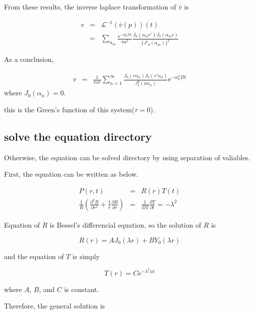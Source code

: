 \documentclass{article}
\begin{document}
From these results, the inverse laplace transformation of $\bar{v}$ is

\begin{eqnarray}
  v &=& \mathscr{L}^{-1} \left(\bar{v}(p)\right)(t) \nonumber \\
    &=& \sum_{\alpha_m} \frac{\mathrm{e}^{-\alpha_{m}^{2}Dt}}{\pi a^2}
        \frac{J_0(\alpha_mr')J_0(\alpha_mr)}{\{J'_0(\alpha_m)\}^2}
\end{eqnarray}

As a conclusion,

\begin{eqnarray}
    v &=& \frac{1}{\pi a^2}
          \sum^\infty_{n=1} \frac{J_0(r\alpha_n)J_0(r'\alpha_n)}{J^2_1(a\alpha_n)}
                            \mathrm{e}^{-\alpha^2_n Dt}
\end{eqnarray}
where $J_0(\alpha_n) = 0$.

this is the Green's function of this system($\tau = 0$).

\subsection{solve the equation directory}

Otherwise, the equation can be solved directory by using separation of valiables.

First, the equation can be written as below.

\begin{eqnarray}
    P(r,t) &=& R(r)T(t) \nonumber \\
    \frac{1}{R}\left(\frac{\partial^2 R}{\partial r^2}
    + \frac{1}{r}\frac{\partial R}{\partial r}\right)
    &=& \frac{1}{DT} \frac{\partial T}{\partial t} = -\lambda^2 \nonumber
\end{eqnarray}

Equation of $R$ is Bessel's differencial equation, so the solution of $R$ is

\begin{equation}
    R(r) = AJ_0(\lambda r) + BY_0(\lambda r) \nonumber
\end{equation}

and the equation of $T$ is simply

\begin{equation}
    T(r) = C\mathrm{e}^{- \lambda^2 \alpha t} \nonumber
\end{equation}

where $A$, $B$, and $C$ is constant.

Therefore, the general solution is
\end{document}
